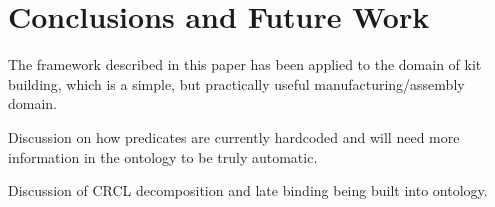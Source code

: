 \section{Conclusions and Future Work}
\label{sect:future}
The framework described in this paper has been applied to the domain of kit building, which is a simple, but practically useful manufacturing/assembly domain.

Discussion on how predicates are currently hardcoded and will need more information in the ontology to be truly automatic.

Discussion of CRCL decomposition and late binding being built into ontology.

